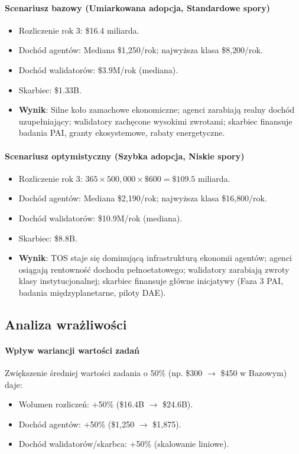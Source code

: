 \documentclass[11pt]{article}
\begin{document}
\paragraph{Scenariusz bazowy (Umiarkowana adopcja, Standardowe spory)}
\begin{itemize}[noitemsep]
  \item Rozliczenie rok 3: \$16.4 miliarda.
  \item Dochód agentów: Mediana \$1{,}250/rok; najwyższa klasa \$8{,}200/rok.
  \item Dochód walidatorów: \$3.9M/rok (mediana).
  \item Skarbiec: \$1.33B.
  \item \textbf{Wynik}: Silne koło zamachowe ekonomiczne; agenci zarabiają realny dochód uzupełniający; walidatory zachęcone wysokimi zwrotami; skarbiec finansuje badania PAI, granty ekosystemowe, rabaty energetyczne.
\end{itemize}

\paragraph{Scenariusz optymistyczny (Szybka adopcja, Niskie spory)}
\begin{itemize}[noitemsep]
  \item Rozliczenie rok 3: $365 \times 500{,}000 \times \$600 = \$109.5$ miliarda.
  \item Dochód agentów: Mediana \$2{,}190/rok; najwyższa klasa \$16{,}800/rok.
  \item Dochód walidatorów: \$10.9M/rok (mediana).
  \item Skarbiec: \$8.8B.
  \item \textbf{Wynik}: TOS staje się dominującą infrastrukturą ekonomii agentów; agenci osiągają rentowność dochodu pełnoetatowego; walidatory zarabiają zwroty klasy instytucjonalnej; skarbiec finansuje główne inicjatywy (Faza 3 PAI, badania międzyplanetarne, piloty DAE).
\end{itemize}

\subsection{Analiza wrażliwości}
\paragraph{Wpływ wariancji wartości zadań}
Zwiększenie średniej wartości zadania o 50\% (np. \$300 $\to$ \$450 w Bazowym) daje:
\begin{itemize}[noitemsep]
  \item Wolumen rozliczeń: +50\% (\$16.4B $\to$ \$24.6B).
  \item Dochód agentów: +50\% (\$1{,}250 $\to$ \$1{,}875).
  \item Dochód walidatorów/skarbca: +50\% (skalowanie liniowe).
\end{itemize}
\end{document}
